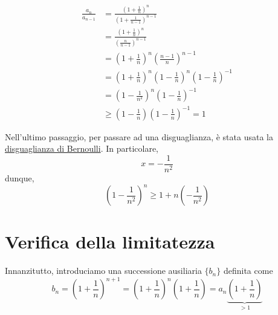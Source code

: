 \documentclass[../../dimostrazioni]{subfiles}
\begin{document}
            \medskip
            \begin{minipage}[t]{.6\textwidth}
                \vspace{-\baselineskip}
                
                \begin{align*}
                    \frac{a_n}{a_{n - 1}} &= \frac{{\left(1 + \frac{1}{n}\right)}^n}{{\left(1 + \frac{1}{n - 1}\right)}^{n - 1}}\\
                    &= \frac{{\left(1 + \frac{1}{n}\right)}^n}{{\left(\frac{n}{n - 1}\right)}^{n - 1}}\\
                    &= {\left(1 + \frac{1}{n}\right)}^n {\left(\frac{n - 1}{n}\right)}^{n - 1}\\
                    &= {\left(1 + \frac{1}{n}\right)}^n {\left(1 - \frac{1}{n}\right)}^n {\left(1 - \frac{1}{n}\right)}^{- 1}\\
                    &= {\left(1 - \frac{1}{n^2}\right)}^n {\left(1 - \frac{1}{n}\right)}^{- 1}\\
                    &\geqslant \left(1 - \frac{1}{n}\right) {\left(1 - \frac{1}{n}\right)}^{-1} = 1
                \end{align*}
            \end{minipage}
            \hfill
            \begin{minipage}[t]{.4\textwidth}
                \vspace{-\baselineskip}
                \vspace{7ex}

                \begin{framed}
                    Nell'ultimo passaggio, per passare ad una disguaglianza, è stata usata la
                    \hyperref[disBernoulli]{disguaglianza di Bernoulli}.
                    In particolare,
                    \[
                        x = -\frac{1}{n^2}
                    \]
                    dunque,
                    \[
                        {\left(1 - \frac{1}{n^2}\right)}^n \geqslant 1 + n \left(- \frac{1}{n^2}\right)
                    \]
                \end{framed}
            \end{minipage}

        \section*{Verifica della limitatezza}

            Innanzitutto, introduciamo una successione ausiliaria \(\{b_n\}\) definita come
            \[
                b_n = {\left(1 + \frac{1}{n}\right)}^{n + 1} = {\left(1 + \frac{1}{n}\right)}^n \left(1 + \frac{1}{n}\right) = a_n \underbrace{\left(1 + \frac{1}{n}\right)}_{> 1}
            \]
            
\end{document}
